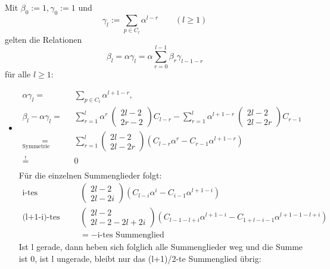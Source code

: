 \documentclass[a4paper, 11pt]{scrreprt}
\begin{document}
Mit \(\beta_0 :=1, \gamma_0:=1 \) und
\begin{equation*}
		\gamma_l:=\sum_{p\in C_l} \alpha^{l-r} \qquad (l\geq 1)
\end{equation*}
gelten die Relationen
\begin{equation}
	\beta_l = \alpha\gamma_l=\alpha\sum_{r=0}^{l-1}\beta_r \gamma_{l-1-r}
\end{equation}
für alle \(l\geq 1\):
\begin{itemize}
	\item \begin{equation}
	\begin{split}
\alpha \gamma_{l} =& \sum_{p \in C_l} \alpha^{l+1-r},\\
\beta_l - \alpha \gamma_l =& \sum_{r=1}^{l} \alpha^r\ \begin{pmatrix} 2l-2\\2r-2\end{pmatrix} C_{l-r} - \sum_{r=1}^{l} \alpha^{l+1-r}\ \begin{pmatrix} 2l-2\\2l-2r\end{pmatrix} C_{r-1}   \\ 
\underset{\text{Symmetrie Binom.}}{=}& \sum_{r=1}^{l} \begin{pmatrix} 2l-2\\2l-2r\end{pmatrix} \left( C_{l-r} \alpha^r - C_{r-1}\alpha^{l+1-r} \right) \\
\overset{!}{=}& 0 \\
\end{split}
\end{equation}
Für die einzelnen Summenglieder folgt:
\begin{align*}
\text{i-tes Summenglied:} &\begin{pmatrix} 2l-2\\2l-2i\end{pmatrix} \left( C_{l-i} \alpha^i - C_{i-1}\alpha^{l+1-i} \right) \\
\text{(l+1-i)-tes Summenglied:}& \begin{pmatrix} 2l-2\\2l-2-2l+2i\end{pmatrix} \left( C_{l-1-l+i} \alpha^{l+1-i} - C_{1+l-i-1}\alpha^{l+1-1-l+i} \right)\\
 &= - \text{i-tes Summenglied}  
\end{align*}
Ist l gerade, dann heben sich folglich alle Summenglieder weg und die Summe ist 0, ist l ungerade, bleibt nur das (l+1)/2-te Summenglied übrig:

\end{itemize}
\end{document}
